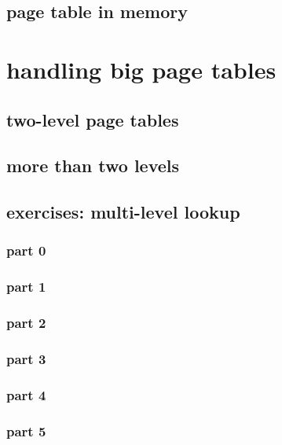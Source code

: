 

\subsection{page table in memory}


\section{handling big page tables}


\subsection{two-level page tables}



\subsection{more than two levels}


\subsection{exercises: multi-level lookup}
\subsubsection{part 0}

\subsubsection{part 1}

\subsubsection{part 2}

\subsubsection{part 3}


\subsubsection{part 4}

\subsubsection{part 5}



